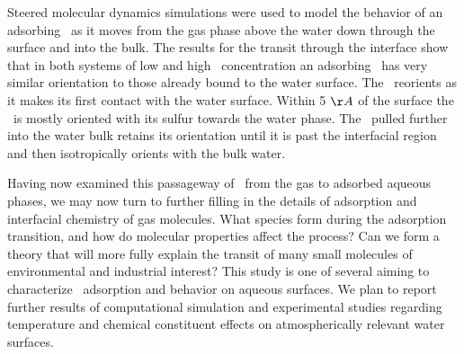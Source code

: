 Steered molecular dynamics simulations were used to model the behavior of an adsorbing \suldiox~as it moves from the gas phase above the water down through the surface and into the bulk. The results for the transit through the interface show that in both systems of low and high \suldiox~concentration an adsorbing \suldiox~has very similar orientation to those already bound to the water surface. The \suldiox~reorients as it makes its first contact with the water surface. Within 5 $\AA$ of the surface the \suldiox~is mostly oriented with its sulfur towards the water phase. The \suldiox~pulled further into the water bulk retains its orientation until it is past the interfacial region and then isotropically orients with the bulk water.

Having now examined this passageway of \suldiox~from the gas to adsorbed aqueous phases, we may now turn to further filling in the details of adsorption and interfacial chemistry of gas molecules. What species form during the adsorption transition, and how do molecular properties affect the process? Can we form a theory that will more fully explain the transit of many small molecules of environmental and industrial interest? This study is one of several aiming to characterize \suldiox~adsorption and behavior on aqueous surfaces. We plan to report further results of computational simulation and experimental studies regarding temperature and chemical constituent effects on atmospherically relevant water surfaces.

